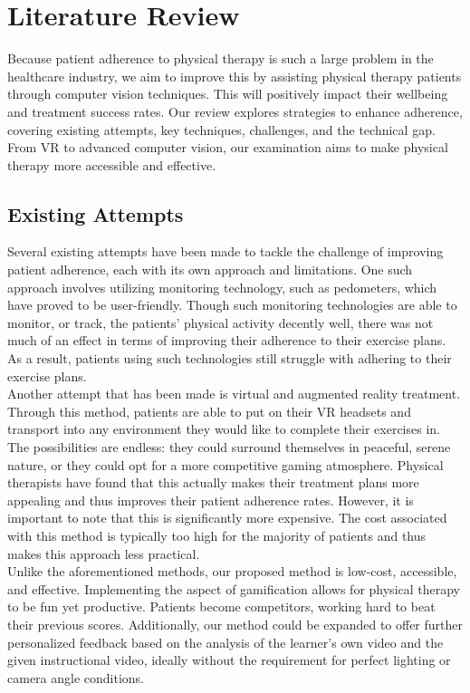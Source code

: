 \section{Literature Review}
\label{sec:litreview}

\indent Because patient adherence to physical therapy is such a large problem in the healthcare industry, we aim to 
improve this by assisting physical therapy patients through computer vision techniques. This will positively impact 
their wellbeing and treatment success rates. Our review explores strategies to enhance adherence, covering existing 
attempts, key techniques, challenges, and the technical gap. From VR to advanced computer vision, our examination aims 
to make physical therapy more accessible and effective.

\subsection{Existing Attempts}
\indent Several existing attempts have been made to tackle the challenge of improving patient adherence, 
each with its own approach and limitations. One such approach involves utilizing monitoring technology, 
such as pedometers, which have proved to be user-friendly. Though such monitoring technologies are 
able to monitor, or track, the patients' physical activity decently well, there was not much of an effect in terms 
of improving their adherence to their exercise plans\cite{Alpher10}. As a result, patients using such technologies still struggle with 
adhering to their exercise plans.
\\
\indent Another attempt that has been made is virtual and augmented reality treatment. Through this method, patients 
are able to put on their VR headsets and transport into any environment they would like to complete their exercises in. 
The possibilities are endless: they could surround themselves in peaceful, serene nature, or they could 
opt for a more competitive gaming atmosphere. Physical therapists have found that this actually 
makes their treatment plans more appealing and thus improves their patient adherence rates\cite{Authors14j}. However, 
it is important to note that this is significantly more expensive. The cost associated with this 
method is typically too high for the majority of patients and thus makes this approach less practical.
\\
\indent Unlike the aforementioned methods, our proposed method is low-cost, accessible, and effective. 
Implementing the aspect of gamification allows for physical therapy to be fun yet productive. Patients become 
competitors, working hard to beat their previous scores. Additionally, our method could be expanded to offer 
further personalized feedback based on the analysis of the learner's own video and the given instructional video, 
ideally without the requirement for perfect lighting or camera angle conditions.

